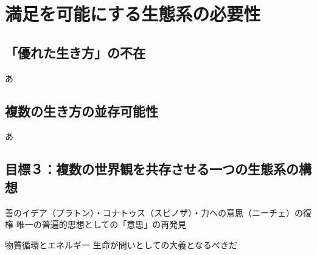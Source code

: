\section{満足を可能にする生態系の必要性}\label{ux6e80ux8db3ux3092ux53efux80fdux306bux3059ux308bux751fux614bux7cfbux306eux5fc5ux8981ux6027}

\subsection{「優れた生き方」の不在}\label{ux512aux308cux305fux751fux304dux65b9ux306eux4e0dux5728}

あ

\subsection{複数の生き方の並存可能性}\label{ux8907ux6570ux306eux751fux304dux65b9ux306eux4e26ux5b58ux53efux80fdux6027}

あ

\subsection{目標３：複数の世界観を共存させる一つの生態系の構想}\label{ux76eeux6a19uxff13ux8907ux6570ux306eux4e16ux754cux89b3ux3092ux5171ux5b58ux3055ux305bux308bux4e00ux3064ux306eux751fux614bux7cfbux306eux69cbux60f3}

善のイデア（プラトン）・コナトゥス（スピノザ）・力への意思（ニーチェ）の復権
唯一の普遍的思想としての「意思」の再発見

物質循環とエネルギー 生命が問いとしての大義となるべきだ
